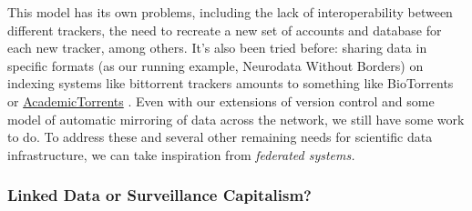 \documentclass[10pt]{article}
\begin{document}
\begin{multicols}{2}
This model has its own problems, including the lack of interoperability
between different trackers, the need to recreate a new set of accounts
and database for each new tracker, among others. It's also been tried
before: sharing data in specific formats (as our running example,
Neurodata Without Borders) on indexing systems like bittorrent trackers
amounts to something like BioTorrents \cite{langilleBioTorrentsFileSharing2010}  or
\href{https://academictorrents.com/}{AcademicTorrents} \cite{cohenAcademicTorrentsCommunityMaintained2014} . Even with our
extensions of version control and some model of automatic mirroring of
data across the network, we still have some work to do. To address these
and several other remaining needs for scientific data infrastructure, we
can take inspiration from \emph{federated systems.}


\end{multicols}


\hypertarget{linked-data-or-surveillance-capitalism}{%
\subsubsection{Linked Data or Surveillance
Capitalism?}\label{linked-data-or-surveillance-capitalism}}
\end{document}
